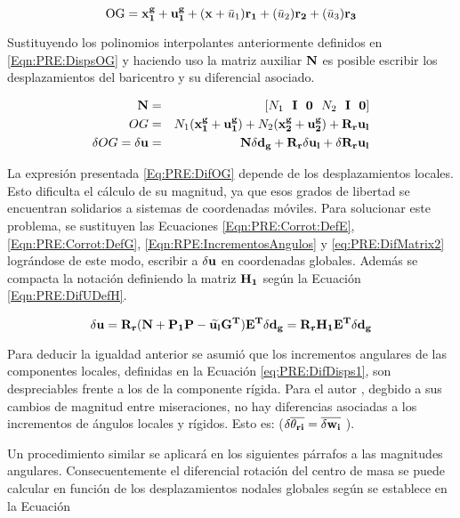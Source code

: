 \begin{equation}\label{Eqn:PRE:DispsOG}
 	\text{OG} = \bf{x}_1^g+\bf{u}_1^g + (x+\text{$\bar{u}_1$}) \bf{r_1} + (\text{$\bar{u}_2$})\bf{r_2}+ (\text{$\bar{u}_3$})\bf{r_3}	
\end{equation}

Sustituyendo los polinomios interpolantes anteriormente definidos en \eqref{Eqn:PRE:DispsOG} y haciendo uso la matriz auxiliar $\bf{N}$ es posible escribir los desplazamientos del baricentro y su diferencial asociado. 

\begin{eqnarray}
	\bf{N}&=&[\text{$N_1$}~~ \bf{I}~~ \bf{0}~~ \text{$N_2$}~~ \bf{I}~~ \bf{0}]\\
	OG    &=& \text{$N_1$}(\bf{x}_1^g+\bf{u}_1^g)+\text{$N_2$}(\bf{x}_2^g+\bf{u}_2^g)+ \bf{R}_r \bf{u}_l \\ \label{Eq:PRE:DifOG}
	\delta OG = \delta \bf{u} &= &\bf{N}\delta\bf{d}_g+\bf{R}_r \delta\bf{u}_l + \delta \bf{R}_r \bf{u}_l	
\end{eqnarray}

 La expresión presentada \eqref{Eq:PRE:DifOG} depende de los desplazamientos locales. Esto dificulta el cálculo de su magnitud, ya que esos grados de libertad se encuentran solidarios a sistemas de coordenadas móviles. Para solucionar este problema, se sustituyen las Ecuaciones \eqref{Eqn:PRE:Corrot:DefE}, \eqref{Eqn:PRE:Corrot:DefG}, \eqref{Eqn:RPE:IncrementosAngulos} y \eqref{eq:PRE:DifMatrix2} lográndose de este modo, escribir a $ \delta \bf{u}$ en coordenadas globales. Además se compacta la notación definiendo la matriz $\bf{H}_1$ según la Ecuación \eqref{Eqn:PRE:DifUDefH}.
 
 \begin{equation}\label{Eqn:PRE:DifUDefH}
	\delta \bf{u} = \bf{R}_r(\bf{N}+\bf{P}_1\bf{P}-\widetilde{\bf{u}_l}\bf{G}^T)\bf{E}^T \delta \bf{d}_g = \bf{R}_r \bf{H}_1 \bf{E}^T \delta \bf{d}_g 
 \end{equation}
 
 Para deducir la igualdad anterior se asumió que los incrementos angulares de las componentes locales, definidas en la Ecuación \eqref{eq:PRE:DifDisps1}, son despreciables frente a los de la componente rígida. Para el autor \cite{Le2014}, degbido a sus cambios de magnitud entre miseraciones, no hay diferencias asociadas a los incrementos de ángulos locales y rígidos. Esto es: ($\delta \overline{\bf{\theta}_{ri}}= \overline{\delta \bf{w}_i}$ ).
 
 Un procedimiento similar se aplicará en los siguientes párrafos a las magnitudes angulares. Consecuentemente el diferencial rotación del centro de masa se puede calcular en función de los desplazamientos nodales globales según se establece en la Ecuación 
 

